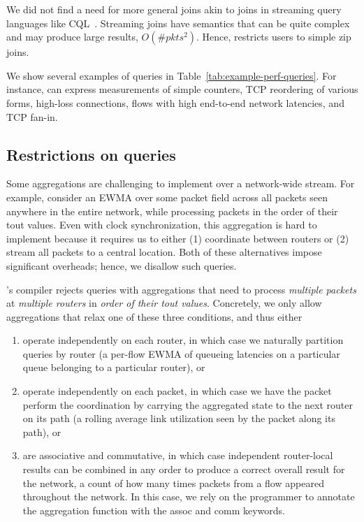 We did not find a need for more general joins akin to joins in streaming query
languages like CQL~\cite{cql-vldb}. Streaming joins have semantics that can be
quite complex and may produce large results, \ie $O(\#pkts^2)$.  Hence,
\TheSystem restricts users to simple {\ct zip} joins.

We show several examples of \TheSystem queries in
Table~\ref{tab:example-perf-queries}.  For instance, \TheSystem can express
measurements of simple counters, TCP reordering of various forms, high-loss
connections, flows with high end-to-end network latencies, and TCP fan-in. 


\subsection{Restrictions on \TheSystem queries}
Some aggregations are challenging to implement over a network-wide stream. For
example, consider an EWMA over some packet field across all packets seen
anywhere in the entire network, while processing packets in the order of their
{\ct tout} values. Even with clock synchronization, this aggregation is hard to
implement because it requires us to either (1) coordinate between routers or
(2) stream all packets to a central location. Both of these alternatives impose
significant overheads; hence, we disallow such queries.

\TheSystem's compiler rejects queries with aggregations that need to process
{\em multiple packets} at {\em multiple routers} in {\em order of their {\ct
tout} values}. Concretely, we only allow aggregations that relax one of these
three conditions, and thus either
\begin{enumerate}
\item operate independently on each router, in which case we naturally
  partition queries by router (\eg a per-flow EWMA of queueing latencies on a
  particular queue belonging to a particular router), or
\item operate independently on each packet, in which case we have the packet
  perform the coordination by carrying the aggregated state to the next router on
  its path (\eg a rolling average link utilization seen by the packet
  along its path), or
\item are associative and commutative, in which case independent router-local results can be
  combined in any order to produce a correct overall result for the network,
  \eg a count of how many times packets from a flow
  appeared throughout the network. In this case, we rely on the
  programmer to annotate the aggregation function with the
  {\ct assoc} and {\ct comm} keywords.
\end{enumerate}
